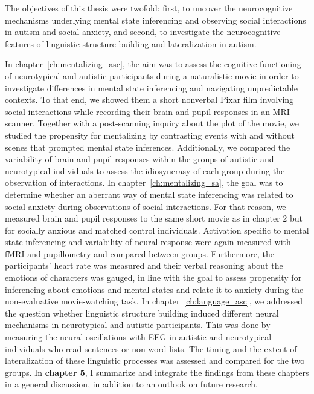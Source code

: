 The objectives of this thesis were twofold: first, to uncover the neurocognitive mechanisms underlying mental state inferencing and observing social interactions in autism and social anxiety, and second, to investigate the neurocognitive features of linguistic structure building and lateralization in autism. 

In chapter~\ref{ch:mentalizing_asc}, the aim was to assess the cognitive functioning of neurotypical and autistic participants during a naturalistic movie in order to investigate differences in mental state inferencing and navigating unpredictable contexts. To that end, we showed them a short nonverbal Pixar film involving social interactions while recording their brain and pupil responses in an MRI scanner. Together with a post-scanning inquiry about the plot of the movie, we studied the propensity for mentalizing by contrasting events with and without scenes that prompted mental state inferences. Additionally, we compared the variability of brain and pupil responses within the groups of autistic and neurotypical individuals to assess the idiosyncrasy of each group during the observation of interactions. In chapter~\ref{ch:mentalizing_sa}, the goal was to determine whether an aberrant way of mental state inferencing was related to social anxiety during observations of social interactions. For that reason, we measured brain and pupil responses to the same short movie as in chapter 2 but for socially anxious and matched control individuals. Activation specific to mental state inferencing and variability of neural response were again measured with fMRI and pupillometry and compared between groups. Furthermore, the participants' heart rate was measured and their verbal reasoning about the emotions of characters was gauged, in line with the goal to assess propensity for inferencing about emotions and mental states and relate it to anxiety during the non-evaluative movie-watching task. In chapter~\ref{ch:language_asc}, we addressed the question whether linguistic structure building induced different neural mechanisms in neurotypical and autistic participants. This was done by measuring the neural oscillations with EEG in autistic and neurotypical individuals who read sentences or non-word lists. The timing and the extent of lateralization of these linguistic processes was assessed and compared for the two groups. In \textbf{chapter 5}, I summarize and integrate the findings from these chapters in a general discussion, in addition to an outlook on future research.
